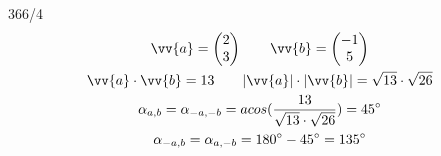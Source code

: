 \begin{exercise}{366/4}
  \begin{gather*}
    \vv{a} = \begin{pmatrix}2 \\ 3\end{pmatrix} \qquad \vv{b} = \begin{pmatrix}-1 \\ 5\end{pmatrix} \\
    \vv{a} \cdot \vv{b} = 13 \qquad |\vv{a}| \cdot |\vv{b}| = \sqrt{13} \cdot \sqrt{26} \\
    \alpha_{a,b} = \alpha_{-a,-b} = acos(\frac{13}{\sqrt{13} \cdot \sqrt{26}}) = 45^\circ \\
    \alpha_{-a,b} = \alpha_{a,-b} = 180^\circ - 45^\circ = 135^\circ
  \end{gather*}
\end{exercise}
